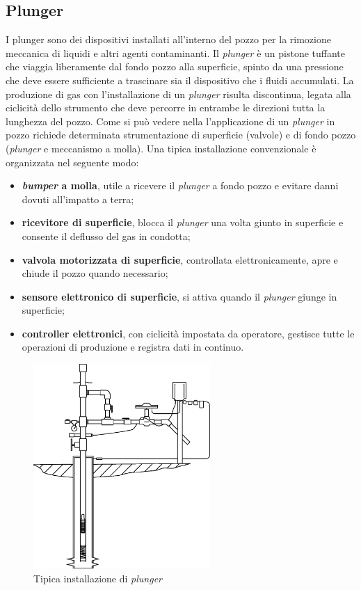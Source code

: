 \subsection{Plunger}
I plunger sono dei dispositivi installati all'interno del pozzo per la rimozione meccanica di liquidi e altri agenti contaminanti. Il \textit{plunger} è un pistone tuffante che viaggia liberamente dal fondo pozzo alla superficie, spinto da una pressione che deve essere sufficiente a trascinare sia il dispositivo che i fluidi accumulati. La produzione di gas con l'installazione di un \textit{plunger} risulta discontinua, legata alla ciclicità dello strumento che deve percorre in entrambe le direzioni tutta la lunghezza del pozzo. Come si può vedere nella  l'applicazione di un \textit{plunger} in pozzo richiede determinata strumentazione di superficie (valvole) e di fondo pozzo (\textit{plunger} e meccanismo a molla). Una tipica installazione convenzionale è organizzata nel seguente modo:

\begin{itemize}
    \item \textbf{\textit{bumper} a molla}, utile a ricevere il \textit{plunger} a fondo pozzo e evitare danni dovuti all'impatto a terra;
    \item \textbf{ricevitore di superficie}, blocca il \textit{plunger} una volta giunto in superficie e consente il deflusso del gas in condotta;
    \item \textbf{valvola motorizzata di superficie}, controllata elettronicamente, apre e chiude il pozzo quando necessario;
    \item \textbf{sensore elettronico di superficie}, si attiva quando il \textit{plunger} giunge in superficie;
    \item \textbf{controller elettronici}, con ciclicità impostata da operatore, gestisce tutte le operazioni di produzione e registra dati in continuo.
\end{itemize}

\begin{figure}[htbp]
    \centering
    \includegraphics[width=0.6\textwidth]{fig/foamer/plunger-installation.eps}
    \caption{Tipica installazione di \textit{plunger} \parencite{lea2011gas}}
    \label{fig:plunger-installation}
\end{figure}

